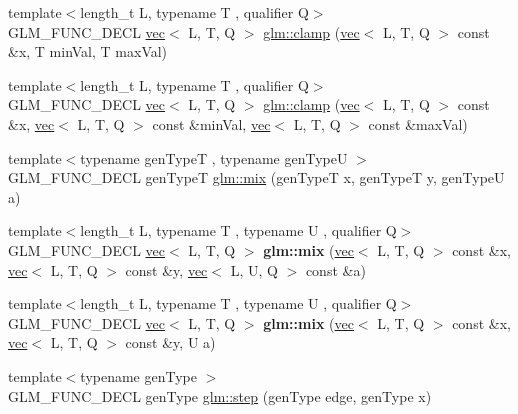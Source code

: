 \begin{DoxyCompactItemize}
\item 
{\footnotesize template$<$length\+\_\+t L, typename T , qualifier Q$>$ }\\G\+L\+M\+\_\+\+F\+U\+N\+C\+\_\+\+D\+E\+CL \hyperlink{structglm_1_1vec}{vec}$<$ L, T, Q $>$ \hyperlink{group__core__func__common_gabff13e6547edac08f52b4133ff4bf183}{glm\+::clamp} (\hyperlink{structglm_1_1vec}{vec}$<$ L, T, Q $>$ const \&x, T min\+Val, T max\+Val)
\item 
{\footnotesize template$<$length\+\_\+t L, typename T , qualifier Q$>$ }\\G\+L\+M\+\_\+\+F\+U\+N\+C\+\_\+\+D\+E\+CL \hyperlink{structglm_1_1vec}{vec}$<$ L, T, Q $>$ \hyperlink{group__core__func__common_ga748333282a6f2f87762c0a4739c8c364}{glm\+::clamp} (\hyperlink{structglm_1_1vec}{vec}$<$ L, T, Q $>$ const \&x, \hyperlink{structglm_1_1vec}{vec}$<$ L, T, Q $>$ const \&min\+Val, \hyperlink{structglm_1_1vec}{vec}$<$ L, T, Q $>$ const \&max\+Val)
\item 
{\footnotesize template$<$typename gen\+TypeT , typename gen\+TypeU $>$ }\\G\+L\+M\+\_\+\+F\+U\+N\+C\+\_\+\+D\+E\+CL gen\+TypeT \hyperlink{group__core__func__common_ga8e93f374aae27d1a88b921860351f8d4}{glm\+::mix} (gen\+TypeT x, gen\+TypeT y, gen\+TypeU a)
\item 
\mbox{\label{group__core__func__common_ga2f4d9048be98850541fca540eaad50e9}} 
{\footnotesize template$<$length\+\_\+t L, typename T , typename U , qualifier Q$>$ }\\G\+L\+M\+\_\+\+F\+U\+N\+C\+\_\+\+D\+E\+CL \hyperlink{structglm_1_1vec}{vec}$<$ L, T, Q $>$ {\bfseries glm\+::mix} (\hyperlink{structglm_1_1vec}{vec}$<$ L, T, Q $>$ const \&x, \hyperlink{structglm_1_1vec}{vec}$<$ L, T, Q $>$ const \&y, \hyperlink{structglm_1_1vec}{vec}$<$ L, U, Q $>$ const \&a)
\item 
\mbox{\label{group__core__func__common_gac18f8fdaae00f0a27a4d01d3aa507aad}} 
{\footnotesize template$<$length\+\_\+t L, typename T , typename U , qualifier Q$>$ }\\G\+L\+M\+\_\+\+F\+U\+N\+C\+\_\+\+D\+E\+CL \hyperlink{structglm_1_1vec}{vec}$<$ L, T, Q $>$ {\bfseries glm\+::mix} (\hyperlink{structglm_1_1vec}{vec}$<$ L, T, Q $>$ const \&x, \hyperlink{structglm_1_1vec}{vec}$<$ L, T, Q $>$ const \&y, U a)
\item 
{\footnotesize template$<$typename gen\+Type $>$ }\\G\+L\+M\+\_\+\+F\+U\+N\+C\+\_\+\+D\+E\+CL gen\+Type \hyperlink{group__core__func__common_ga015a1261ff23e12650211aa872863cce}{glm\+::step} (gen\+Type edge, gen\+Type x)

\end{DoxyCompactItemize}
